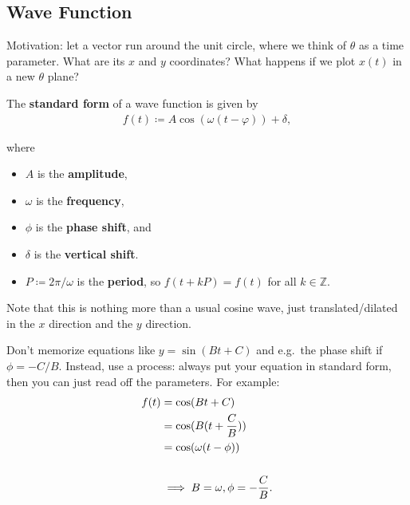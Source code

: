 \hypertarget{wave-function}{%
\subsection{Wave Function}\label{wave-function}}

\begin{remark}

Motivation: let a vector run around the unit circle, where we think of
\(\theta\) as a time parameter. What are its \(x\) and \(y\)
coordinates? What happens if we plot \(x(t)\) in a new \(\theta\) plane?

\end{remark}

\begin{definition}

The \textbf{standard form} of a wave function is given by
\begin{align*}
f(t) \coloneqq A \cos(\omega (t - \varphi)) + \delta
,\end{align*}

where

\begin{itemize}
\tightlist
\item
  \(A\) is the \textbf{amplitude},
\item
  \(\omega\) is the \textbf{frequency},
\item
  \(\phi\) is the \textbf{phase shift}, and
\item
  \(\delta\) is the \textbf{vertical shift}.
\item
  \(P \coloneqq 2\pi / \omega\) is the \textbf{period}, so
  \(f(t+kP) = f(t)\) for all \(k\in {\mathbb{Z}}\).
\end{itemize}


\end{definition}

\begin{remark}

Note that this is nothing more than a usual cosine wave, just
translated/dilated in the \(x\) direction and the \(y\) direction.

\end{remark}

\begin{warnings}

Don't memorize equations like \(y=\sin(Bt+C)\) and e.g.~the phase shift
if \(\phi = -C/B\). Instead, use a process: always put your equation in
standard form, then you can just read off the parameters. For example:
\begin{align*}
f(t) 
&= \cos(Bt+C) \\
&= \cos( B (t + {C\over B}) ) \\
&= \cos(\omega (t - \phi) ) \\ \\
&\implies B = \omega, \phi = -{C\over B}
.\end{align*}

\end{warnings}

